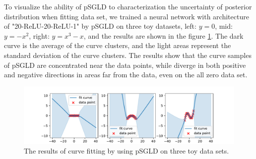 To visualize the ability of pSGLD to characterization the uncertainty of posterior distribution when fitting data set, we trained a neural network with architecture of "20-ReLU-20-ReLU-1" by pSGLD on three toy datasets, left: $y=0$, mid: $y=-x^2$, right: $y=x^3-x$, and the results are shown in the figure \ref{fig:three}. The dark curve is the average of the curve clusters, and the light areas represent the standard deviation of the curve clusters. The results show that the curve samples of pSGLD are concentrated near the data points, while diverge in both positive and negative directions in areas far from the data, even on the all zero data set.
\begin{figure}[htbp]
   \begin{center}
      \centerline{\includegraphics[width=480pt]{figs/three-curve}}
   \caption{The results of curve fitting by using pSGLD on three toy data sets.}
   \label{fig:three}
   \end{center}
\end{figure}

